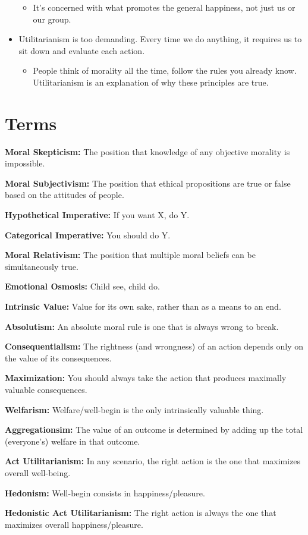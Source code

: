 \documentclass[12pt]{article}
\begin{document}
\begin{itemize}
          \begin{itemize}
              \item It's concerned with what promotes the general happiness, not just us or our group.
          \end{itemize}
    \item Utilitarianism is too demanding. Every time we do anything, it requires us to sit down and evaluate each action.
          \begin{itemize}
              \item People think of morality all the time, follow the rules you already know. Utilitarianism is an explanation of why these principles are true.
          \end{itemize}
\end{itemize}

\section{Terms}

\noindent

\textbf{Moral Skepticism:} The position that knowledge of any objective morality is impossible.

\textbf{Moral Subjectivism:} The position that ethical propositions are true or false based on the attitudes of people.

\textbf{Hypothetical Imperative:} If you want X, do Y.

\textbf{Categorical Imperative:} You should do Y.

\textbf{Moral Relativism:} The position that multiple moral beliefs can be simultaneously true.

\textbf{Emotional Osmosis:} Child see, child do.

\textbf{Intrinsic Value:} Value for its own sake, rather than as a means to an end.

\textbf{Absolutism:} An absolute moral rule is one that is always wrong to break.

\textbf{Consequentialism:} The rightness (and wrongness) of an action depends only on the value of its consequences.

\textbf{Maximization:} You should always take the action that produces maximally valuable consequences.

\textbf{Welfarism:} Welfare/well-begin is the only intrinsically valuable thing.

\textbf{Aggregationsim:} The value of an outcome is determined by adding up the total (everyone's) welfare in that outcome.

\textbf{Act Utilitarianism:} In any scenario, the right action is the one that maximizes overall well-being.

\textbf{Hedonism:} Well-begin consists in happiness/pleasure.

\textbf{Hedonistic Act Utilitarianism:} The right action is always the one that maximizes overall happiness/pleasure.
\end{document}
